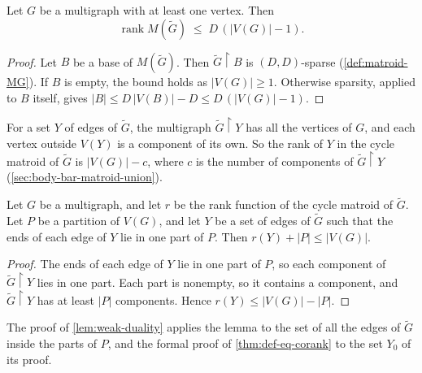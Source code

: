 \begin{lemma}
  \label{lem:rank-matroidMG-le}
  \leanok
  Let $G$ be a multigraph with at least one vertex. Then
  \[
    \operatorname{rank} M(\tilde G) \;\le\; D\,(|V(G)| - 1).
  \]
\end{lemma}
\begin{proof}
  \leanok
  Let $B$ be a base of $M(\tilde G)$. Then $\tilde G \restriction B$ is
  $(D, D)$-sparse (\cref{def:matroid-MG}). If $B$ is empty, the bound
  holds as $|V(G)| \ge 1$. Otherwise sparsity, applied to $B$ itself,
  gives $|B| \le D\,|V(B)| - D \le D\,(|V(G)| - 1)$.
\end{proof}

For a set $Y$ of edges of $\tilde G$, the multigraph
$\tilde G \restriction Y$ has all the vertices of $G$, and each vertex
outside $V(Y)$ is a component of its own. So the rank of $Y$ in the
cycle matroid of $\tilde G$ is $|V(G)| - c$, where $c$ is the number of
components of $\tilde G \restriction Y$
(\cref{sec:body-bar-matroid-union}).

\begin{lemma}
  \label{lem:rk-within-parts}
  \leanok
  Let $G$ be a multigraph, and let $r$ be the rank function of the cycle
  matroid of $\tilde G$. Let $P$ be a partition of $V(G)$, and let $Y$
  be a set of edges of $\tilde G$ such that the ends of each edge of $Y$
  lie in one part of $P$. Then $r(Y) + |P| \le |V(G)|$.
\end{lemma}
\begin{proof}
  \leanok
  The ends of each edge of $Y$ lie in one part of $P$, so each
  component of $\tilde G \restriction Y$ lies in one part. Each part is
  nonempty, so it contains a component, and $\tilde G \restriction Y$
  has at least $|P|$ components. Hence $r(Y) \le |V(G)| - |P|$.
\end{proof}

The proof of \cref{lem:weak-duality} applies the lemma to the set of all
the edges of $\tilde G$ inside the parts of $P$, and the formal proof of
\cref{thm:def-eq-corank} to the set $Y_0$ of its proof.

